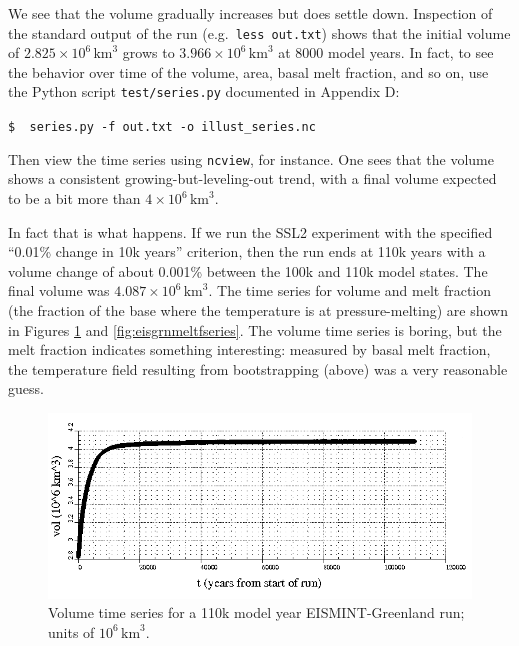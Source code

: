 \documentclass[11pt,final]{amsart}
\begin{document}
We see that the volume gradually increases but does settle down.  Inspection of the standard output of the run (e.g.~\verb|less out.txt|) shows that the initial volume of $2.825 \times 10^{6}\,\text{km}^3$ grows to $3.966 \times 10^{6}\,\text{km}^3$ at $8000$ model years.  In fact, to see the behavior over time of the volume, area, basal melt fraction, and so on, use the Python script \verb|test/series.py| documented in Appendix D:

\verb|$  series.py -f out.txt -o illust_series.nc|

\noindent Then view the time series using \verb|ncview|, for instance.  One sees that the volume shows a consistent growing-but-leveling-out trend, with a final volume expected to be a bit more than $4 \times 10^{6}\,\text{km}^3$.

In fact that is what happens.  If we run the SSL2 experiment with the specified ``0.01\% change in 10k years'' criterion, then the run ends at 110k years with a volume change of about 0.001\% between the 100k and 110k model states.  The final volume was $4.087 \times 10^{6}\,\text{km}^3$.  The time series for volume and melt fraction (the fraction of the base where the temperature is at pressure-melting) are shown in Figures \ref{fig:eisgrnvolseries} and \ref{fig:eisgrnmeltfseries}.  The volume time series is boring, but the melt fraction indicates something interesting: measured by basal melt fraction, the temperature field resulting from bootstrapping (above) was a very reasonable guess.

\begin{figure}[ht]
\includegraphics[width=6.0in,keepaspectratio=true]{figs/eisgrn_volseries}
\caption{Volume time series for a 110k model year EISMINT-Greenland run; units of $10^{6}\,\text{km}^3$.}
\label{fig:eisgrnvolseries}
\end{figure}
\end{document}
